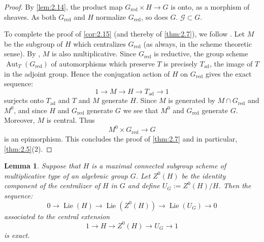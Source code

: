 \documentclass[11pt,a4paper]{article}
\theoremstyle{plain}
\newtheorem{lemma}[theorem]{Lemma}
\theoremstyle{definition}
\DeclareMathOperator{\Aut}{Aut}
\DeclareMathOperator{\Lie}{Lie}
\newcommand{\red}{\mathrm{red}}
\newcommand{\ad}{\mathrm{ad}}
\begin{document}
\begin{proof}
By \ref{lem:2.14}, the product map $G_\red \times H \to G$ is onto, as a morphism of sheaves. As both $G_\red$ and $H$ normalize $G_\red$, so does $G$. $\mathcal{G} \subset G$.

To complete the proof of \ref{cor:2.15} (and thereby of \ref{thm:2.7}), we follow \cite[\S2.25]{D}. Let $M$ be the subgroup of $H$ which centralizes $G_\red$ (as always, in the scheme theoretic sense). By \cite[Corollary~2.4(a), page~476]{DG}, $M$ is also multiplicative. Since $G_\red$ is reductive, the group scheme $\Aut_T(G_\red)$ of automorphisms which preserve $T$ is precisely $T_\ad$, the image of $T$ in the adjoint group. Hence the conjugation action of $H$ on $G_\red$ gives the exact sequence:
\begin{equation} \label{eq:2.15.1}
1 \to M \to H \to T_\ad \to 1
\end{equation}
surjects onto $T_\ad$ and $T$ and $M$ generate $H$. Since $M$ is generated by $M \cap G_\red$ and $M^0$, and since $H$ and $G_\red$ generate $G$ we see that $M^0$ and $G_\red$ generate $G$. Moreover, $M$ is central. Thus
\begin{equation} \label{eq:2.15.2}
M^0 \times G_\red \to G
\end{equation}
is an epimorphism. This concludes the proof of \ref{thm:2.7} and in particular, \ref{thm:2.5}(2). \qedhere
\end{proof}

\begin{lemma} \label{lem:2.16}
Suppose that $H$ is a maximal connected subgroup scheme of multiplicative type of an algebraic group $G$. Let $Z^0(H)$ be the identity component of the centralizer of $H$ in $G$ and define $U_G := Z^0(H)/H$. Then the sequence:
\begin{equation} \label{eq:2.16.1}
0 \to \Lie(H) \to \Lie(Z^0(H)) \to \Lie(U_G) \to 0
\end{equation}
associated to the central extension
\begin{equation} \label{eq:2.16.2}
1 \to H \to Z^0(H) \to U_G \to 1
\end{equation}
is exact.
\end{lemma}
\end{document}
